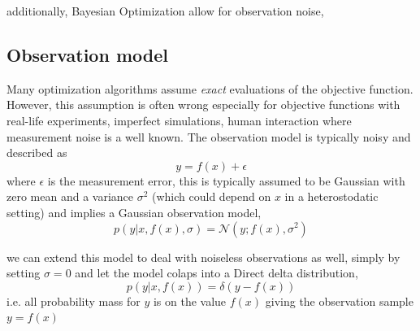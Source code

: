 additionally, Bayesian Optimization allow for observation noise, 

\subsection{Observation model}\label{ObsModel}
Many optimization algorithms assume \textit{exact} evaluations of the objective function. However, this assumption
is often wrong especially for objective functions with real-life experiments, imperfect simulations, human interaction 
where measurement noise is a well known. The observation model is typically noisy and described as
$$y = f(x)+\epsilon$$ where $\epsilon$ is the measurement error, this is
typically assumed to be Gaussian with zero mean and a variance
$\sigma^2$ (which could depend on $x$ in a heterostodatic setting) and implies a Gaussian observation model, 
$$p(y|x,f(x),\sigma) = \mathcal{N}(y;f(x),\sigma^2)$$ 

we can extend this model to deal with noiseless observations as well, simply by setting $\sigma = 0$ and let the
model colaps into a Direct delta distribution, 
$$p(y|x, f(x)) = \mathcal{\delta}(y-f(x))$$
i.e. all probability mass for $y$ is on the value $f(x)$ giving the observation sample $y = f(x)$


